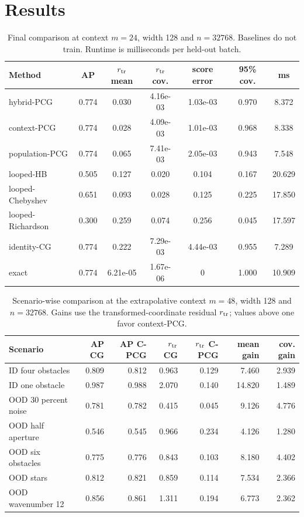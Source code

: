 \documentclass[10pt]{article}
\begin{document}
\FloatBarrier
\section{Results}
\begin{table}[t]
\centering\small
\caption{Final comparison at context $m=24$, width
128 and $n=32768$.  Baselines do
not train.  Runtime is milliseconds per held-out batch.}
\begin{tabular}{lcccccc}
\toprule Method & AP & $r_{\rm tr}$ mean & $r_{\rm tr}$ cov. & score error & 95\% cov. & ms\\
\midrule
hybrid-PCG & 0.774 & 0.030 & 4.16e-03 & 1.03e-03 & 0.970 & 8.372 \\
context-PCG & 0.774 & 0.028 & 4.09e-03 & 1.01e-03 & 0.968 & 8.338 \\
population-PCG & 0.774 & 0.065 & 7.41e-03 & 2.05e-03 & 0.943 & 7.548 \\
looped-HB & 0.505 & 0.127 & 0.020 & 0.104 & 0.167 & 20.629 \\
looped-Chebyshev & 0.651 & 0.093 & 0.028 & 0.125 & 0.225 & 17.850 \\
looped-Richardson & 0.300 & 0.259 & 0.074 & 0.256 & 0.045 & 17.597 \\
identity-CG & 0.774 & 0.222 & 7.29e-03 & 4.44e-03 & 0.955 & 7.289 \\
exact & 0.774 & 6.21e-05 & 1.67e-06 & 0 & 1.000 & 10.909 \\
\bottomrule
\end{tabular}
\end{table}

\begin{table}[t]
\centering\scriptsize
\caption{Scenario-wise comparison at the extrapolative context
$m=48$, width 128 and
$n=32768$.  Gains use the transformed-coordinate
residual $r_{\rm tr}$; values above one favor context-PCG.}
\begin{tabular}{lrrrrrr}
\toprule Scenario & AP CG & AP C-PCG & $r_{\rm tr}$ CG & $r_{\rm tr}$ C-PCG & mean gain & cov. gain\\
\midrule
ID four obstacles & 0.809 & 0.812 & 0.963 & 0.129 & 7.460 & 2.939 \\
ID one obstacle & 0.987 & 0.988 & 2.070 & 0.140 & 14.820 & 1.489 \\
OOD 30 percent noise & 0.781 & 0.782 & 0.415 & 0.045 & 9.126 & 4.776 \\
OOD half aperture & 0.546 & 0.545 & 0.966 & 0.234 & 4.126 & 1.280 \\
OOD six obstacles & 0.775 & 0.776 & 0.843 & 0.103 & 8.180 & 4.402 \\
OOD stars & 0.812 & 0.821 & 0.859 & 0.114 & 7.534 & 2.366 \\
OOD wavenumber 12 & 0.856 & 0.861 & 1.311 & 0.194 & 6.773 & 2.362 \\
\bottomrule
\end{tabular}
\end{table}
\end{document}
